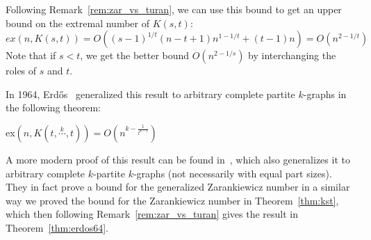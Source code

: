 \begin{remark}
    Following Remark~\ref{rem:zar_vs_turan}, we can use this bound to get an upper bound on the extremal number of $K(s, t)$:
    \[
        ex(n, K(s, t)) = O\left((s - 1)^{1 / t}(n - t + 1)n^{1 - 1 / t} + (t - 1)n\right) = O\left(n^{2 - 1 / t}\right)
    \]
    Note that if $s < t$, we get the better bound $O\left(n^{2 - 1 / s}\right)$ by interchanging the roles of $s$ and $t$.
\end{remark}

In 1964, Erdős~\cite{Erods1964} generalized this result to arbitrary complete partite $k$-graphs in the following theorem:

\begin{theorem}\label{thm:erdos64}
    ex$(n, K(t, \overset{k}{\cdots}, t)) = O\left(n^{k - \frac{1}{t^{k-1}}}\right)$
\end{theorem}

A more modern proof of this result can be found in~\cite{carvajal2024canonical},
which also generalizes it to arbitrary complete
$k$-partite $k$-graphs (not necessarily with equal part sizes).
They in fact prove a bound for the generalized Zarankiewicz number
in a similar way we proved the bound for the Zarankiewicz number in Theorem~\ref{thm:kst},
which then following Remark~\ref{rem:zar_vs_turan} gives the result in Theorem~\ref{thm:erdos64}.



